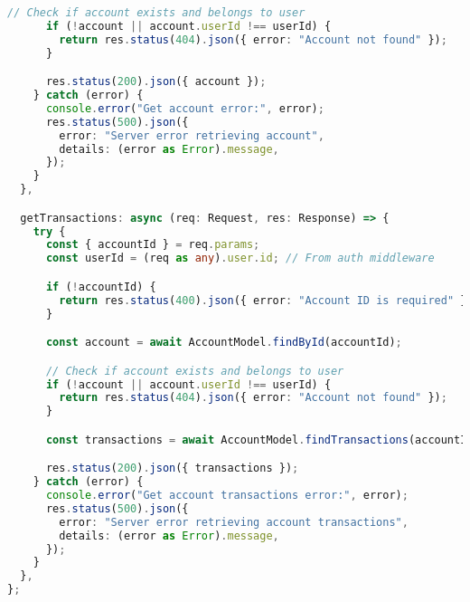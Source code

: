 \begin{lstlisting}[language=TypeScript]
      // Check if account exists and belongs to user
      if (!account || account.userId !== userId) {
        return res.status(404).json({ error: "Account not found" });
      }

      res.status(200).json({ account });
    } catch (error) {
      console.error("Get account error:", error);
      res.status(500).json({
        error: "Server error retrieving account",
        details: (error as Error).message,
      });
    }
  },

  getTransactions: async (req: Request, res: Response) => {
    try {
      const { accountId } = req.params;
      const userId = (req as any).user.id; // From auth middleware

      if (!accountId) {
        return res.status(400).json({ error: "Account ID is required" });
      }

      const account = await AccountModel.findById(accountId);

      // Check if account exists and belongs to user
      if (!account || account.userId !== userId) {
        return res.status(404).json({ error: "Account not found" });
      }

      const transactions = await AccountModel.findTransactions(accountId);

      res.status(200).json({ transactions });
    } catch (error) {
      console.error("Get account transactions error:", error);
      res.status(500).json({
        error: "Server error retrieving account transactions",
        details: (error as Error).message,
      });
    }
  },
};
\end{lstlisting}

